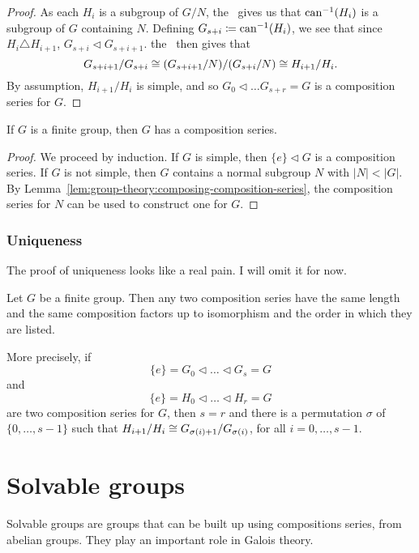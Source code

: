 \begin{proof}
  As each \(H_{i}\) is a subgroup of \(G/N\), the~ gives us that \(\operatorname{can}^{-1}(H_{i})\) is a subgroup of \(G\) containing \(N\). Defining \(G_{s + i} \coloneqq \operatorname{can}^{-1}(H_{i})\), we see that since \(H_{i} \triangle H_{i+1}\), \(G_{s+i} \triangleleft G_{s+i+1}\). the~ then gives that
  \[G_{s+i+1} / G_{s+i} \cong (G_{s+i+1} / N) / (G_{s + i} / N) \cong H_{i+1} / H_{i}.\]
  By assumption, \(H_{i+1} / H_{i}\) is simple, and so \(G_{0} \triangleleft \ldots G_{s+r} = G\) is a composition series for \(G\).
\end{proof}


\begin{proposition}
  If \(G\) is a finite group, then \(G\) has a composition series.
\end{proposition}

\begin{proof}
  We proceed by induction. If \(G\) is simple, then \(\{e\} \triangleleft G\) is a composition series. If \(G\) is not simple, then \(G\) contains a normal subgroup \(N\) with \(|N| < |G|\). By Lemma~\ref{lem:group-theory:composing-composition-series}, the composition series for \(N\) can be used to construct one for \(G\).
\end{proof}

\subsubsection{Uniqueness}
The proof of uniqueness looks like a real pain. I will omit it for now.
\begin{theorem}
  Let \(G\) be a finite group. Then any two composition series have the same length and the same composition factors up to isomorphism and the order in which they are listed.

  More precisely, if
  \[\{e\} = G_{0} \triangleleft \ldots \triangleleft G_{s} = G\]
  and
  \[\{e\} = H_{0} \triangleleft \ldots \triangleleft H_{r} = G\]
  are two composition series for \(G\), then \(s = r\) and there is a permutation \(\sigma\) of \(\{0, \ldots, s-1\}\) such that \(H_{i+1}/H_{i} \cong G_{\sigma(i) + 1} / G_{\sigma(i)}\), for all \(i = 0, \ldots, s-1\).
\end{theorem}



\section{Solvable groups}
Solvable groups are groups that can be built up using compositions series, from abelian groups. They play an important role in Galois theory.

